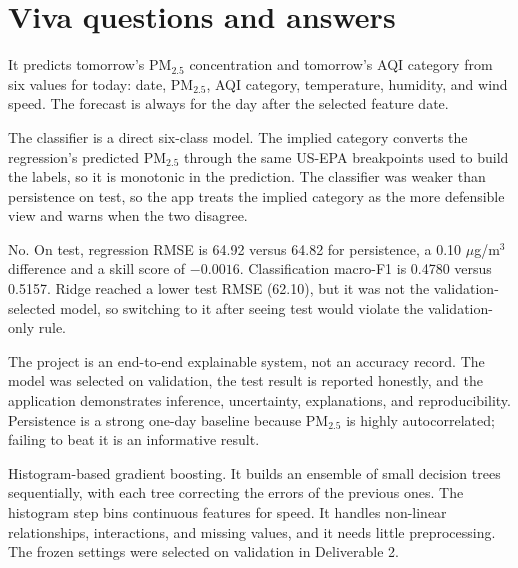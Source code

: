 
\section{Viva questions and answers}
\label{app:viva}

\begin{description}[leftmargin=1.2em,style=nextline,itemsep=4pt]
  \item[What does the app predict?]
  It predicts tomorrow's PM$_{2.5}$ concentration and tomorrow's AQI category
  from six values for today: date, PM$_{2.5}$, AQI category, temperature,
  humidity, and wind speed. The forecast is always for the day after the
  selected feature date.

  \item[Why are there two AQI category views?]
  The classifier is a direct six-class model. The implied category converts the
  regression's predicted PM$_{2.5}$ through the same US-EPA breakpoints used to
  build the labels, so it is monotonic in the prediction. The classifier was
  weaker than persistence on test, so the app treats the implied category as the
  more defensible view and warns when the two disagree.

  \item[Does the model beat persistence?]
  No. On test, regression RMSE is 64.92 versus 64.82 for persistence, a
  0.10 $\mu$g/m$^3$ difference and a skill score of $-0.0016$. Classification
  macro-F1 is 0.4780 versus 0.5157. Ridge reached a lower test RMSE (62.10), but
  it was not the validation-selected model, so switching to it after seeing test
  would violate the validation-only rule.

  \item[Why keep a model that does not beat persistence?]
  The project is an end-to-end explainable system, not an accuracy record. The
  model was selected on validation, the test result is reported honestly, and
  the application demonstrates inference, uncertainty, explanations, and
  reproducibility. Persistence is a strong one-day baseline because PM$_{2.5}$ is
  highly autocorrelated; failing to beat it is an informative result.

  \item[What is HGB?]
  Histogram-based gradient boosting. It builds an ensemble of small decision
  trees sequentially, with each tree correcting the errors of the previous ones.
  The histogram step bins continuous features for speed. It handles non-linear
  relationships, interactions, and missing values, and it needs little
  preprocessing. The frozen settings were selected on validation in Deliverable
  2.


\end{description}
